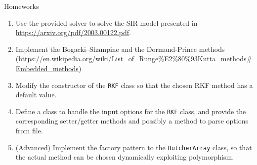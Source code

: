 \documentclass[10pt]{beamer}
\begin{document}
\begin{frame}{Homeworks}
\begin{enumerate}
\item Use the provided solver to solve the SIR model presented in \url{https://arxiv.org/pdf/2003.00122.pdf}.
\item Implement the Bogacki–Shampine and the Dormand-Prince methods (\url{https://en.wikipedia.org/wiki/List_of_Runge\%E2\%80\%93Kutta_methods\#Embedded_methods})
\item Modify the constructor of the \texttt{RKF} class so that the chosen RKF method has a default value.

\item Define a class to handle the input options for the \texttt{RKF} class, and provide the corresponding setter/getter methods and possibly a method to parse options from file.

\item (Advanced) Implement the factory pattern to the \texttt{ButcherArray} class, so that the actual method can be chosen dynamically exploiting polymorphism.
\end{enumerate}
\end{frame}
\end{document}
